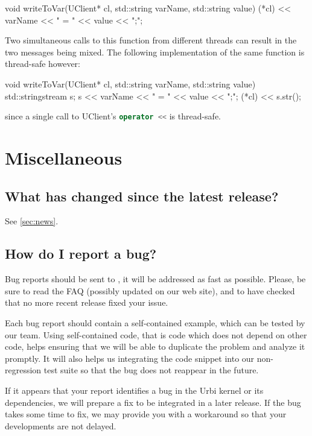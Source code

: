 \begin{cxx}
void
writeToVar(UClient* cl, std::string varName, std::string value)
{
  (*cl) << varName << " = " << value << ";";
}
\end{cxx}

Two simultaneous calls to this function from different threads can
result in the two messages being mixed.  The following implementation
of the same function is thread-safe however:

\begin{cxx}
void
writeToVar(UClient* cl, std::string varName, std::string value)
{
  std::stringstream s;
  s << varName << " = " << value << ";";
  (*cl) << s.str();
}
\end{cxx}

\noindent
since a single call to UClient's \lstinline[language=C++]|operator <<|
is thread-safe.


\section{Miscellaneous}
\subsection{What has changed since the latest release?}
See \autoref{sec:news}.

\subsection{How do I report a bug?}

Bug reports should be sent to , it
will be addressed as fast as possible.  Please, be sure to read the
FAQ (possibly updated on our web site), and to have checked that no
more recent release fixed your issue.

Each bug report should contain a self-contained example, which can be
tested by our team. Using self-contained code, that is code which does
not depend on other code, helps ensuring that we will be able to
duplicate the problem and analyze it promptly. It will also helps us
integrating the code snippet into our non-regression test suite so
that the bug does not reappear in the future.

If it appears that your report identifies a bug in the Urbi kernel or
its dependencies, we will prepare a fix to be integrated in a later
release. If the bug takes some time to fix, we may provide you with a
workaround so that your developments are not delayed.

